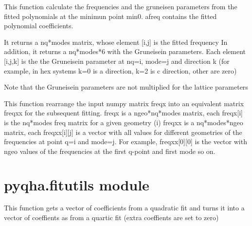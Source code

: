 \documentclass[letterpaper,10pt,english]{sphinxmanual}
\begin{document}
\begin{fulllineitems}
\label{pyqha:pyqha.fitfreqgrun.freqmingrun}
This function calculate the frequencies and the gruneisen parameters 
from the fitted polynomials at the minimun point min0. afreq contains the 
fitted polynomial coefficients.

It returns a nq*modes matrix, whose element {[}i,j{]} is the fitted frequency 
In addition, it returns a nq*modes*6 with the Gruneisein parameters.
Each element {[}i,j,k{]} is the the Gruneisein parameter at nq=i, mode=j and direction
k (for example, in hex systems k=0 is a direction, k=2 is c direction, other are zero)

Note that the Gruneisein parameters are not multiplied for the lattice parameters

\end{fulllineitems}


\begin{fulllineitems}
\label{pyqha:pyqha.fitfreqgrun.rearrange_freqx}
This function rearrange the input numpy matrix freqx into an equivalent matrix freqxx
for the subsequent fitting.
freqx is a ngeo*nq*modes matrix, each freqx{[}i{]} is the nq*modes freq matrix for a given geometry (i)
freqxx is a nq*modes*ngeo matrix, each freqxx{[}i{]}{[}j{]} is a vector with all values for different
geometries of the frequencies at point q=i and mode=j. For example, freqxx{[}0{]}{[}0{]}
is the vector with ngeo values of the frequencies at the first q-point and first mode so on.

\end{fulllineitems}



\section{pyqha.fitutils module}
\label{pyqha:pyqha-fitutils-module}\label{pyqha:module-pyqha.fitutils}

\begin{fulllineitems}
\label{pyqha:pyqha.fitutils.expand_quadratic_to_quartic}
This function gets a vector of coefficients from a quadratic fit and turns it
into a vector of coeffients as from a quartic fit (extra coeffients are set to zero)

\end{fulllineitems}
\end{document}
